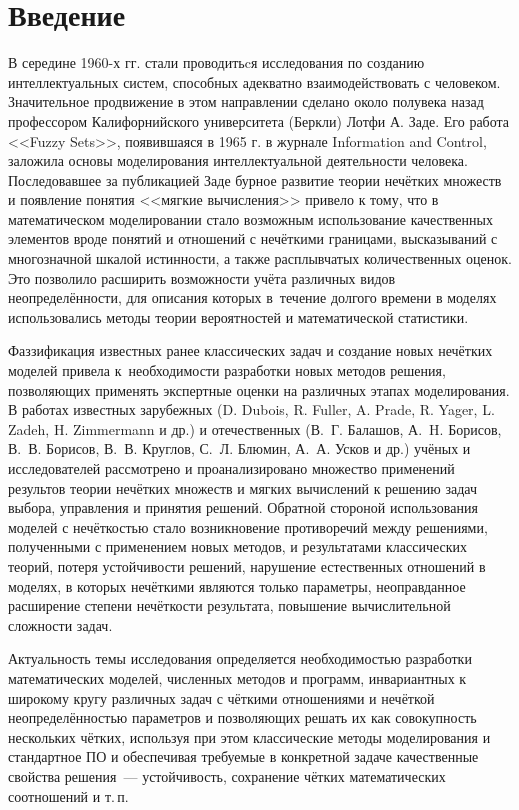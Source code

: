 \chapter*{Введение}

В середине 1960-х гг. стали проводитьcя исследования по созданию интеллектуальных систем, способных адекватно взаимодействовать с человеком. Значительное продвижение в этом направлении сделано около полувека назад профессором Калифорнийского университета (Беркли) Лотфи А. Заде. Его работа <<Fuzzy Sets>>, появившаяся в 1965 г. в журнале Information and Control, заложила основы моделирования интеллектуальной деятельности человека. Последовавшее за публикацией Заде бурное развитие теории нечётких множеств и появление понятия <<мягкие вычисления>> привело к тому, что в математическом моделировании стало возможным использование качественных элементов вроде понятий и отношений с нечёткими границами, высказываний с многозначной шкалой истинности, а также расплывчатых количественных оценок. Это позволило расширить возможности учёта различных видов неопределённости, для описания которых в~течение долгого времени в моделях использовались методы теории вероятностей и математической статистики.

Фаззификация известных ранее классических задач и создание новых нечётких моделей привела к~необходимости разработки новых методов решения, позволяющих применять экспертные оценки на различных этапах моделирования. В работах известных зарубежных (D. Dubois, R. Fuller, A. Prade, R. Yager, L. Zadeh, H. Zimmermann и др.) и отечественных (В.~Г. Балашов, А.~H. Борисов, В.~В. Борисов, В.~В. Круглов, С.~Л. Блюмин, А.~А. Усков и др.) учёных и исследователей рассмотрено и проанализировано множество применений результов теории нечётких множеств и мягких вычислений к решению задач выбора, управления и принятия решений. Обратной стороной использования моделей с нечёткостью стало возникновение противоречий между решениями, полученными с применением новых методов, и результатами классических теорий, потеря устойчивости решений, нарушение естественных отношений в моделях, в которых нечёткими являются только параметры, неоправданное расширение степени нечёткости результата, повышение вычислительной сложности задач.

Актуальность темы исследования определяется необходимостью разработки математических моделей, численных методов и программ, инвариантных к широкому кругу различных задач с чёткими отношениями и нечёткой неопределённостью параметров и позволяющих решать их как совокупность нескольких чётких, используя при этом классические методы моделирования и стандартное ПО и обеспечивая требуемые в конкретной задаче качественные свойства решения~--- устойчивость, сохранение чётких математических соотношений и т.\,п.

